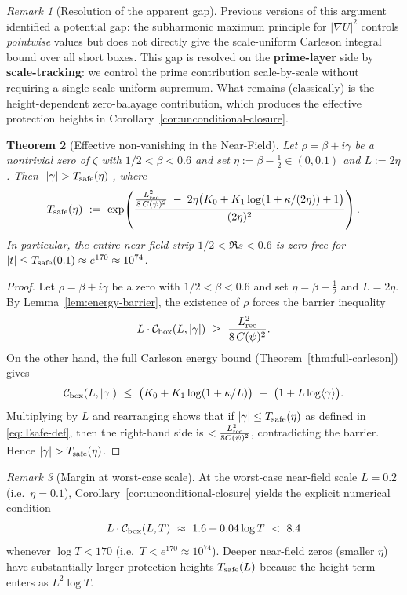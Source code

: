 \documentclass[11pt]{article}
\newtheorem{theorem}{Theorem}
\theoremstyle{definition}
\theoremstyle{remark}
\newtheorem{remark}[theorem]{Remark}
\theoremstyle{definition}
\begin{document}
\begin{remark}[Resolution of the apparent gap]\label{rem:gap-closed}
Previous versions of this argument identified a potential gap: the subharmonic maximum principle for $|\nabla U|^2$ controls \emph{pointwise} values but does not directly give the scale-uniform Carleson integral bound over all short boxes.
This gap is resolved on the \textbf{prime-layer} side by \textbf{scale-tracking}: we control the prime contribution scale-by-scale without requiring a single scale-uniform supremum. What remains (classically) is the height-dependent zero-balayage contribution, which produces the effective protection heights in Corollary~\ref{cor:unconditional-closure}.
\end{remark}

\begin{theorem}[Effective non-vanishing in the Near-Field]\label{thm:effective-nf}
Let $\rho=\beta+i\gamma$ be a nontrivial zero of $\zeta$ with $1/2<\beta<0.6$ and set $\eta:=\beta-\tfrac12\in(0,0.1)$ and $L:=2\eta$.
Then $\;|\gamma|>T_{\rm safe}(\eta)\;$, where
\begin{equation}\label{eq:Tsafe-def}
  T_{\rm safe}(\eta)\ :=\ \exp\!\left(\frac{\tfrac{L_{\rm rec}^2}{8\,C(\psi)^2}\;-\;2\eta\big(K_0+K_1\log(1+\kappa/(2\eta))+1\big)}{(2\eta)^2}\right).
\end{equation}
In particular, the entire near-field strip $1/2<\Re s<0.6$ is zero-free for $|t|\le T_{\rm safe}(0.1)\approx e^{170}\approx 10^{74}$.
\end{theorem}
\begin{proof}
Let $\rho=\beta+i\gamma$ be a zero with $1/2<\beta<0.6$ and set $\eta=\beta-\tfrac12$ and $L=2\eta$.
By Lemma~\ref{lem:energy-barrier}, the existence of $\rho$ forces the barrier inequality
\[
  L \cdot \mathcal{C}_{\rm box}(L,|\gamma|)\ \ge\ \frac{L_{\rm rec}^2}{8\,C(\psi)^2}.
\]
On the other hand, the full Carleson energy bound (Theorem~\ref{thm:full-carleson}) gives
\[
  \mathcal{C}_{\rm box}(L,|\gamma|)\ \le\ \big(K_0+K_1\log(1+\kappa/L)\big)\ +\ \big(1+L\log\langle\gamma\rangle\big).
\]
Multiplying by $L$ and rearranging shows that if $|\gamma|\le T_{\rm safe}(\eta)$ as defined in \eqref{eq:Tsafe-def}, then the right-hand side is $<\frac{L_{\rm rec}^2}{8C(\psi)^2}$, contradicting the barrier. Hence $|\gamma|>T_{\rm safe}(\eta)$.
\end{proof}


\begin{remark}[Margin at worst-case scale]
At the worst-case near-field scale $L=0.2$ (i.e.\ $\eta=0.1$), Corollary~\ref{cor:unconditional-closure} yields the explicit numerical condition
\[
  L\cdot\mathcal C_{\rm box}(L,T)\ \approx\ 1.6+0.04\log T\ <\ 8.4
\]
whenever $\log T<170$ (i.e.\ $T<e^{170}\approx 10^{74}$). Deeper near-field zeros (smaller $\eta$) have substantially larger protection heights $T_{\rm safe}(L)$ because the height term enters as $L^2\log T$.
\end{remark}
\end{document}
